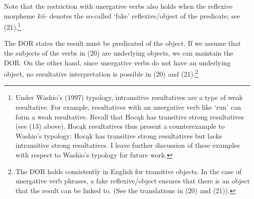\documentclass[output=paper]{LSP/langsci}
\begin{document}
\begin{exe}
\ex
\begin{xlist}



\end{xlist}
\end{exe}

Note that the restriction with unergative verbs also holds when the reflexive morpheme \textit{kii-} denotes the so-called `fake' reflexive/object of the predicate; see (21).\footnote{Under Washio's (1997) typology, intransitive resultatives are a type of weak resultative. For example, resultatives with an unergative verb like `run' can form a weak resultative. Recall that Hoc\k{a}k has transitive strong resultatives (see (13) above). Hoc\k{a}k resultatives thus present a counterexample to Washio's typology: Hoc\k{a}k has transitive strong resultatives but lacks intransitive strong resultatives. I leave further discussion of these examples with respect to Washio's typology for future work.}

\begin{exe}


\end{exe}

The DOR states the result must be predicated of the object. If we assume that the subjects of the verbs in (20) are underlying objects, we can maintain the DOR. On the other hand, since unergative verbs do not have an underlying object, no resultative interpretation is possible in (20) and (21).\footnote{The DOR holds consistently in English for transitive objects. In the case of unergative verb phrases, a fake reflexive/object ensures that there is an object that the result can be linked to. (See the translations in (20) and (21)).}
\end{document}
